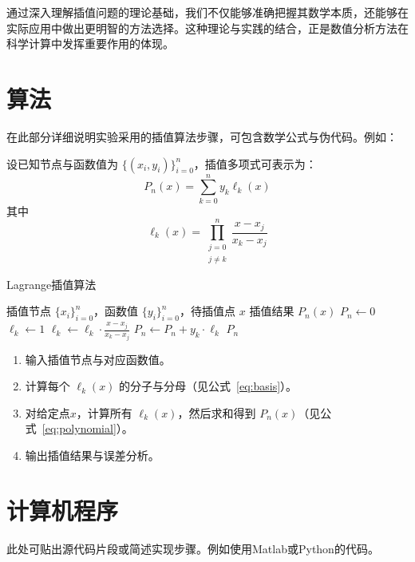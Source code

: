 \documentclass{joulabreport}
\begin{document}
{通过深入理解插值问题的理论基础，我们不仅能够准确把握其数学本质，还能够在实际应用中做出更明智的方法选择。这种理论与实践的结合，正是数值分析方法在科学计算中发挥重要作用的体现。

\section{算法}
在此部分详细说明实验采用的插值算法步骤，可包含数学公式与伪代码。例如：

设已知节点与函数值为 $\{(x_i,y_i)\}_{i=0}^n$，插值多项式可表示为：
\begin{equation}
P_n(x) = \sum_{k=0}^{n} y_k \ell_k(x)
\label{eq:polynomial}
\end{equation}
其中
\begin{equation}
\ell_k(x) = \prod_{\substack{j=0\\j\neq k}}^n \frac{x - x_j}{x_k - x_j}
\label{eq:basis}
\end{equation}

\begin{algorithm}[htbp]
\caption{Lagrange插值算法}
\label{alg:lagrange}
\begin{algorithmic}[1]
\Require 插值节点 $\{x_i\}_{i=0}^n$，函数值 $\{y_i\}_{i=0}^n$，待插值点 $x$
\Ensure 插值结果 $P_n(x)$
\State $P_n \gets 0$
    \State $\ell_k \gets 1$
            \State $\ell_k \gets \ell_k \cdot \frac{x - x_j}{x_k - x_j}$
        \EndIf
    \EndFor
    \State $P_n \gets P_n + y_k \cdot \ell_k$
\EndFor
\State \Return $P_n$
\end{algorithmic}
\end{algorithm}

\begin{enumerate}
\item 输入插值节点与对应函数值。
\item 计算每个 $\ell_k(x)$ 的分子与分母（见公式~\eqref{eq:basis}）。
\item 对给定点$x$，计算所有 $\ell_k(x)$，然后求和得到 $P_n(x)$（见公式~\eqref{eq:polynomial}）。
\item 输出插值结果与误差分析。
\end{enumerate}

\section{计算机程序}
此处可贴出源代码片段或简述实现步骤。例如使用Matlab或Python的代码。

}
\end{document}
